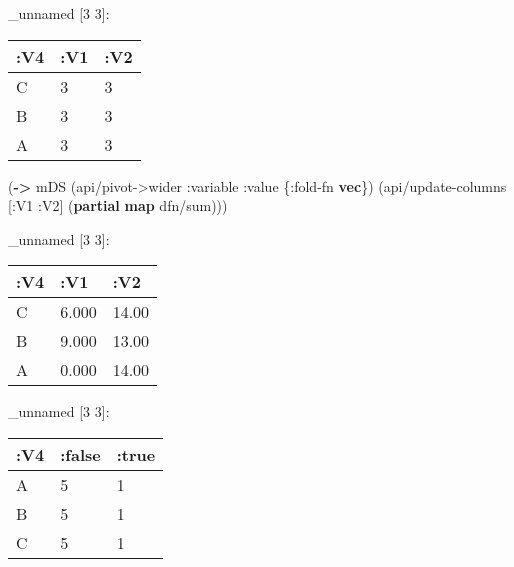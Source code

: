 \documentclass[]{article}
\newenvironment{Shaded}{\begin{snugshade}}{\end{snugshade}}
\newcommand{\KeywordTok}[1]{\textcolor[rgb]{0.13,0.29,0.53}{\textbf{#1}}}
\newcommand{\DecValTok}[1]{\textcolor[rgb]{0.00,0.00,0.81}{#1}}
\newcommand{\CommentTok}[1]{\textcolor[rgb]{0.56,0.35,0.01}{\textit{#1}}}
\newcommand{\VariableTok}[1]{\textcolor[rgb]{0.00,0.00,0.00}{#1}}
\newcommand{\AttributeTok}[1]{\textcolor[rgb]{0.77,0.63,0.00}{#1}}
\newcommand{\NormalTok}[1]{#1}
\begin{document}
\_unnamed {[}3 3{]}:

\begin{longtable}[]{@{}lll@{}}
\toprule
:V4 & :V1 & :V2\tabularnewline
\midrule
\endhead
C & 3 & 3\tabularnewline
B & 3 & 3\tabularnewline
A & 3 & 3\tabularnewline
\bottomrule
\end{longtable}

\begin{Shaded}
\begin{Highlighting}[]
\NormalTok{(}\KeywordTok{->}\NormalTok{ mDS}
\NormalTok{    (api/pivot->wider }\AttributeTok{:variable} \AttributeTok{:value}\NormalTok{ \{}\AttributeTok{:fold-fn} \KeywordTok{vec}\NormalTok{\})}
\NormalTok{    (api/update-columns [}\AttributeTok{:V1} \AttributeTok{:V2}\NormalTok{] (}\KeywordTok{partial} \KeywordTok{map}\NormalTok{ dfn/sum)))}
\end{Highlighting}
\end{Shaded}

\_unnamed {[}3 3{]}:

\begin{longtable}[]{@{}lll@{}}
\toprule
:V4 & :V1 & :V2\tabularnewline
\midrule
\endhead
C & 6.000 & 14.00\tabularnewline
B & 9.000 & 13.00\tabularnewline
A & 0.000 & 14.00\tabularnewline
\bottomrule
\end{longtable}

\begin{Shaded}
\end{Shaded}

\_unnamed {[}3 3{]}:

\begin{longtable}[]{@{}lll@{}}
\toprule
:V4 & :false & :true\tabularnewline
\midrule
\endhead
A & 5 & 1\tabularnewline
B & 5 & 1\tabularnewline
C & 5 & 1\tabularnewline
\bottomrule
\end{longtable}
\end{document}
